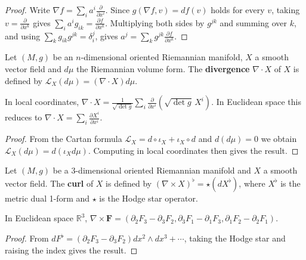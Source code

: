 \begin{proof}
Write $\nabla f=\sum_i a^i\frac{\partial}{\partial x^i}$. Since $g(\nabla f,v)=df(v)$ holds for every $v$, taking $v=\frac{\partial}{\partial x^k}$ gives $\sum_i a^i g_{ik}=\frac{\partial f}{\partial x^k}$. Multiplying both sides by $g^{jk}$ and summing over $k$, and using $\sum_k g_{ik}g^{jk}=\delta_i^j$, gives $a^j=\sum_k g^{jk}\frac{\partial f}{\partial x^k}$.
\end{proof}

\begin{definition}\label{def:divergence_intrinsic}
Let $(M,g)$ be an $n$-dimensional oriented Riemannian manifold, $X$ a smooth vector field and $d\mu$ the Riemannian volume form. The \textbf{divergence} $\nabla\cdot X$ of $X$ is defined by $\mathcal{L}_X(d\mu)=(\nabla\cdot X)d\mu$.
\end{definition}

\begin{proposition}\label{prop:divergence_coordinate}
In local coordinates, $\nabla\cdot X=\frac{1}{\sqrt{\det g}}\sum_i\frac{\partial}{\partial x^i}(\sqrt{\det g}\,X^i)$. In Euclidean space this reduces to $\nabla\cdot X=\sum_i\frac{\partial X^i}{\partial x^i}$.
\end{proposition}

\begin{proof}
From the Cartan formula $\mathcal{L}_X=d\circ\iota_X+\iota_X\circ d$ and $d(d\mu)=0$ we obtain $\mathcal{L}_X(d\mu)=d(\iota_X d\mu)$. Computing in local coordinates then gives the result.
\end{proof}

\begin{definition}\label{def:curl_intrinsic}
Let $(M,g)$ be a $3$-dimensional oriented Riemannian manifold and $X$ a smooth vector field. The \textbf{curl} of $X$ is defined by $(\nabla\times X)^\flat=\star(dX^\flat)$, where $X^\flat$ is the metric dual 1-form and $\star$ is the Hodge star operator.
\end{definition}

\begin{proposition}\label{prop:curl_coordinate}
In Euclidean space $\mathbb{R}^3$, $\nabla\times\mathbf{F}=(\partial_2F_3-\partial_3F_2,\partial_3F_1-\partial_1F_3,\partial_1F_2-\partial_2F_1)$.
\end{proposition}

\begin{proof}
From $dF^\flat=(\partial_2F_3-\partial_3F_2)dx^2\wedge dx^3+\cdots$, taking the Hodge star and raising the index gives the result.
\end{proof}

